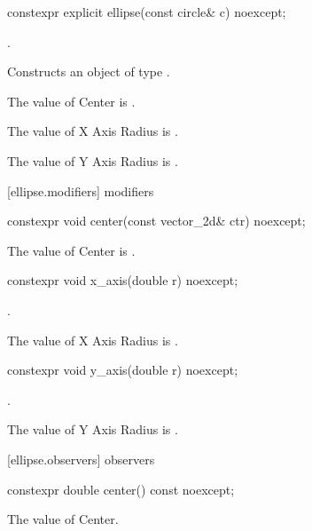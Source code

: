 \begin{itemdecl}
constexpr explicit ellipse(const circle& c) noexcept;
\end{itemdecl}
\begin{itemdescr}
\pnum
\preconditions
{}.

\pnum
\effects
Constructs an object of type .

\pnum
The value of Center is .

\pnum
The value of X Axis Radius is .

\pnum
The value of Y Axis Radius is .
\end{itemdescr}

 [ellipse.modifiers]{ modifiers}

\begin{itemdecl}
constexpr void center(const vector_2d& ctr) noexcept;
\end{itemdecl}

\begin{itemdescr}
\pnum
\effects
The value of Center is .
\end{itemdescr}

\begin{itemdecl}
constexpr void x_axis(double r) noexcept;
\end{itemdecl}
\begin{itemdescr}
\preconditions
{}.

\pnum
\effects
The value of X Axis Radius is .
\end{itemdescr}

\begin{itemdecl}
constexpr void y_axis(double r) noexcept;
\end{itemdecl}
\begin{itemdescr}
\preconditions
{}.

\pnum
\effects
The value of Y Axis Radius is .
\end{itemdescr}

 [ellipse.observers]{ observers}

\begin{itemdecl}
constexpr double center() const noexcept;
\end{itemdecl}
\begin{itemdescr}
\pnum
\returns
The value of Center.
\end{itemdescr}

